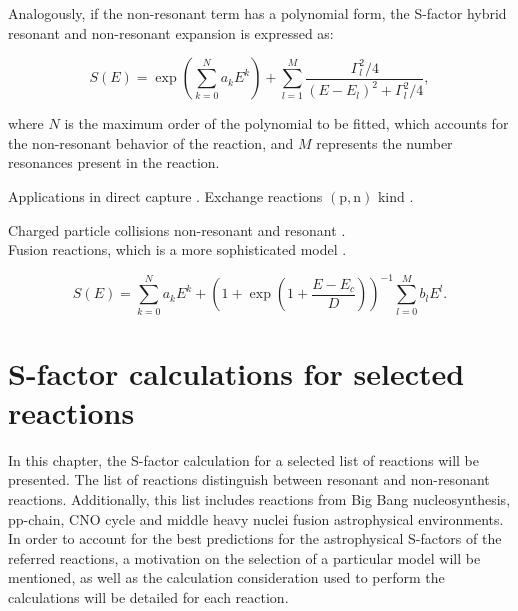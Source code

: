 \documentclass[openany]{book}
\begin{document}
Analogously, if the non-resonant term has a polynomial form, the S-factor hybrid resonant and non-resonant expansion is expressed as:

\begin{equation}  \label{eq:empirical_hybridExponential}
	S(E) =  \exp { \left( \sum _{k = 0}^{N} {a_kE^k} \right) } + \sum_{l = 1}^{M} {\frac{\Gamma_l^2/4}{(E - E_l)^2 + \Gamma_l^2/4}},
\end{equation}

where $N$ is the maximum order of the polynomial to be fitted, which accounts for the non-resonant behavior of the reaction, and $M$ represents the number resonances present in the reaction. 

Applications in direct capture \cite{jennings_karataglidis_shoppa_1998}.  Exchange reactions $\mathrm{(p, n)}$ kind \cite{hussein_abdullah_2020}.

Charged particle collisions non-resonant \cite{ueda_sargeant_pato_hussein_2002} and resonant \cite{ueda_sargeant_pato_hussein_2004}. \\

Fusion reactions, which is a more sophisticated model \cite{beard_afanasjev_chamon_gasques_wiescher_yakovlev_2010}.

\begin{equation} \label{eq:empirical_yakovlev}
	S(E) = \sum_{k=0}^{N} {a_kE^k} + \left(1 + \exp{\left(1 +  \frac{E - E_c}{D}\right)}\right)^{-1} \sum_{l=0}^{M} {b_lE^l}  .
\end{equation}

\chapter{S-factor calculations for selected reactions} \label{ch:sfactorCalculations}

In this chapter, the S-factor calculation for a selected list of reactions will be presented. The list of reactions distinguish between resonant and non-resonant reactions. Additionally, this list includes reactions from Big Bang nucleosynthesis, pp-chain, CNO cycle and middle heavy nuclei fusion astrophysical environments.  \\




In order to account for the best predictions for the astrophysical S-factors of the referred reactions, a motivation on the selection of a particular model will be mentioned, as well as the calculation consideration used to perform the calculations will be detailed for each reaction. \\
\end{document}
